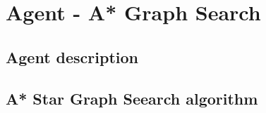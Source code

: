 \section{Agent - A* Graph Search}

\subsection{Agent description}

\subsection{A* Star Graph Seearch algorithm}

